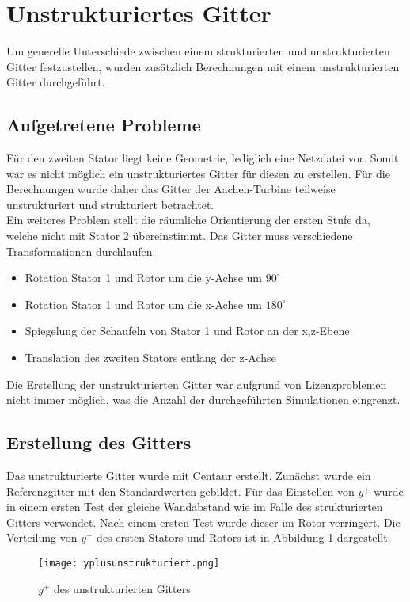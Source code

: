\section{Unstrukturiertes Gitter}
Um generelle Unterschiede zwischen einem strukturierten und unstrukturierten Gitter festzustellen, wurden zusätzlich Berechnungen mit einem unstrukturierten Gitter durchgeführt.

\subsection{Aufgetretene Probleme}
Für den zweiten Stator liegt keine Geometrie, lediglich eine Netzdatei vor. Somit war es nicht möglich ein unstrukturiertes Gitter für diesen zu erstellen. Für die Berechnungen wurde daher das Gitter der Aachen-Turbine teilweise unstrukturiert und strukturiert betrachtet.\\
Ein weiteres Problem stellt die räumliche Orientierung der ersten Stufe da, welche nicht mit Stator 2 übereinstimmt.
Das Gitter muss verschiedene Transformationen durchlaufen:
\begin{itemize}
\item Rotation Stator 1 und Rotor um die y-Achse um $90^\circ$
\item Rotation Stator 1 und Rotor um die x-Achse um $180^\circ$
\item Spiegelung der Schaufeln von Stator 1 und Rotor an der x,z-Ebene
\item Translation des zweiten Stators entlang der z-Achse
\end{itemize}
Die Erstellung der unstrukturierten Gitter war aufgrund von Lizenzproblemen nicht immer möglich, was die Anzahl der durchgeführten Simulationen eingrenzt.
\subsection{Erstellung des Gitters}
Das unstrukturierte Gitter wurde mit Centaur erstellt. Zunächst wurde ein Referenzgitter mit den Standardwerten gebildet. Für das Einstellen von $y^+$ wurde in einem ersten Test der gleiche Wandabstand wie im Falle des strukturierten Gitters verwendet. Nach einem ersten Test wurde dieser im Rotor verringert. Die Verteilung von $y^+$ des ersten Stators und Rotors ist in Abbildung \ref{yplusunstrukturiert} dargestellt.
\begin{figure}[htbp]
	\centering
	\texttt{[image: yplusunstrukturiert.png]}
	\caption{$y^+$ des unstrukturierten Gitters} \label{yplusunstrukturiert}
\end{figure}
